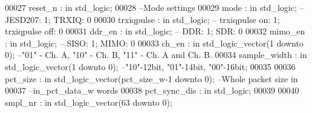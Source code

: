 \begin{DoxyCode}
00027       \textcolor{vhdlchar}{reset_n}              \textcolor{vhdlchar}{:} \textcolor{keywordflow}{in} \textcolor{comment}{std\_logic};
00028 \textcolor{keyword}{      --Mode settings      }
00029       \textcolor{vhdlchar}{mode}                   \textcolor{vhdlchar}{:} \textcolor{keywordflow}{in} \textcolor{comment}{std\_logic};\textcolor{keyword}{ -- JESD207: 1; TRXIQ: 0}
00030       \textcolor{vhdlchar}{trxiqpulse}             \textcolor{vhdlchar}{:} \textcolor{keywordflow}{in} \textcolor{comment}{std\_logic};\textcolor{keyword}{ -- trxiqpulse on: 1; trxiqpulse off: 0}
00031         \textcolor{vhdlchar}{ddr_en}               \textcolor{vhdlchar}{:} \textcolor{keywordflow}{in} \textcolor{comment}{std\_logic};\textcolor{keyword}{ -- DDR: 1; SDR: 0}
00032         \textcolor{vhdlchar}{mimo_en}              \textcolor{vhdlchar}{:} \textcolor{keywordflow}{in} \textcolor{comment}{std\_logic};\textcolor{keyword}{ -- SISO: 1; MIMO: 0}
00033         \textcolor{vhdlchar}{ch_en}                    \textcolor{vhdlchar}{:} \textcolor{keywordflow}{in} \textcolor{comment}{std\_logic\_vector}\textcolor{vhdlchar}{(}\textcolor{vhdllogic}{}\textcolor{vhdllogic}{1} \textcolor{keywordflow}{downto} \textcolor{vhdllogic}{}\textcolor{vhdllogic}{0}\textcolor{vhdlchar}{)};\textcolor{keyword}{ --"01" - Ch. A, "10" - Ch. B, "11" -
       Ch. A and Ch. B.  }
00034       \textcolor{vhdlchar}{sample_width}         \textcolor{vhdlchar}{:} \textcolor{keywordflow}{in} \textcolor{comment}{std\_logic\_vector}\textcolor{vhdlchar}{(}\textcolor{vhdllogic}{}\textcolor{vhdllogic}{1} \textcolor{keywordflow}{downto} \textcolor{vhdllogic}{}\textcolor{vhdllogic}{0}\textcolor{vhdlchar}{)};\textcolor{keyword}{ --"10"-12bit, "01"-14bit, "00"-16bit;}
00035       
00036       \textcolor{vhdlchar}{pct_size}             \textcolor{vhdlchar}{:} \textcolor{keywordflow}{in} \textcolor{comment}{std\_logic\_vector}\textcolor{vhdlchar}{(}\textcolor{vhdlchar}{pct_size_w}\textcolor{vhdlchar}{-}\textcolor{vhdllogic}{}\textcolor{vhdllogic}{1} \textcolor{keywordflow}{downto} \textcolor{vhdllogic}{}\textcolor{vhdllogic}{0}\textcolor{vhdlchar}{)};\textcolor{keyword}{   --Whole packet size in }
00037 \textcolor{keyword}{                                                                           --in\_pct\_data\_w words}
00038       \textcolor{vhdlchar}{pct_sync_dis}         \textcolor{vhdlchar}{:} \textcolor{keywordflow}{in} \textcolor{comment}{std\_logic};
00039                                                                            
00040       \textcolor{vhdlchar}{smpl_nr}              \textcolor{vhdlchar}{:} \textcolor{keywordflow}{in} \textcolor{comment}{std\_logic\_vector}\textcolor{vhdlchar}{(}\textcolor{vhdllogic}{}\textcolor{vhdllogic}{63} \textcolor{keywordflow}{downto} \textcolor{vhdllogic}{}\textcolor{vhdllogic}{0}\textcolor{vhdlchar}{)};

\end{DoxyCode}
